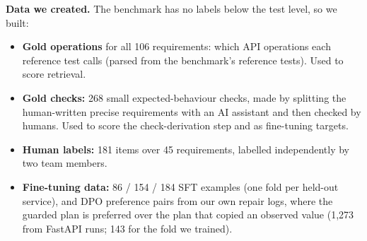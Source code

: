 \documentclass[11pt,a4paper]{article}
\begin{document}
\textbf{Data we created.} The benchmark has no labels below the test level, so we built:
\begin{itemize}
\item \textbf{Gold operations} for all 106 requirements: which API operations each reference test calls (parsed from the benchmark's reference tests). Used to score retrieval.
\item \textbf{Gold checks:} 268 small expected-behaviour checks, made by splitting the human-written precise requirements with an AI assistant and then checked by humans. Used to score the check-derivation step and as fine-tuning targets.
\item \textbf{Human labels:} 181 items over 45 requirements, labelled independently by two team members.
\item \textbf{Fine-tuning data:} 86 / 154 / 184 SFT examples (one fold per held-out service), and DPO preference pairs from our own repair logs, where the guarded plan is preferred over the plan that copied an observed value (1{,}273 from FastAPI runs; 143 for the fold we trained).
\end{itemize}

\end{document}
